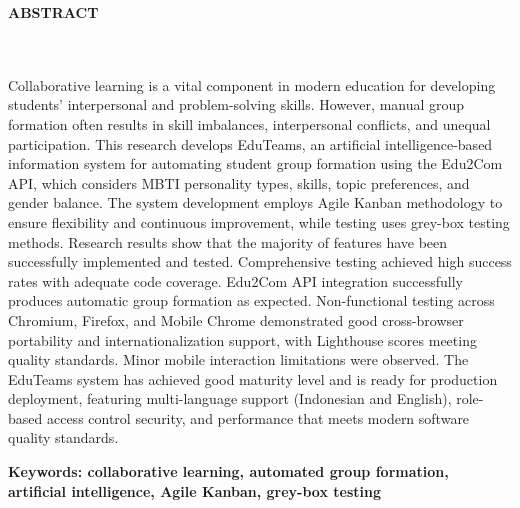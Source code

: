 \clearpage
{}%
\thispagestyle{fancy}

\begin{center}
	\large \bfseries \MakeUppercase{Abstract}\\
	\normalsize \normalfont {\thetitleEN}\\
	\normalsize \normalfont {\theauthor}\\
	\bigskip
	
	\normalsize \normalfont \justifying \singlespacing
	Collaborative learning is a vital component in modern education for developing students' interpersonal and problem-solving skills. However, manual group formation often results in skill imbalances, interpersonal conflicts, and unequal participation. This research develops EduTeams, an artificial intelligence-based information system for automating student group formation using the Edu2Com API, which considers MBTI personality types, skills, topic preferences, and gender balance. The system development employs Agile Kanban methodology to ensure flexibility and continuous improvement, while testing uses grey-box testing methods. Research results show that the majority of features have been successfully implemented and tested. Comprehensive testing achieved high success rates with adequate code coverage. Edu2Com API integration successfully produces automatic group formation as expected. Non-functional testing across Chromium, Firefox, and Mobile Chrome demonstrated good cross-browser portability and internationalization support, with Lighthouse scores meeting quality standards. Minor mobile interaction limitations were observed. The EduTeams system has achieved good maturity level and is ready for production deployment, featuring multi-language support (Indonesian and English), role-based access control security, and performance that meets modern software quality standards.\par
     
    \vspace{20pt}
	\raggedright\textbf{Keywords: collaborative learning, automated group formation, artificial intelligence, Agile Kanban, grey-box testing}
	
	\vfill
	
\end{center}
\clearpage